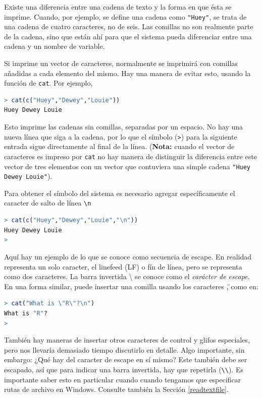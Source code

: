 Existe una diferencia entre una cadena de texto y la forma en que ésta se
imprime. Cuando, por ejemplo, se define una cadena como \texttt{"Huey"}, se
trata de una cadena de cuatro caracteres, no de seis. Las comillas no son
realmente parte de la cadena, sino que están ahí para que el sistema pueda
diferenciar entre una cadena y un nombre de variable.

Si imprime un vector de caracteres, normalmente se imprimirá con comillas
añadidas a cada elemento del mismo. Hay una manera de evitar esto, usando la
función de \texttt{cat}.  Por ejemplo,

\begin{lstlisting}[language=R]
> cat(c("Huey","Dewey","Louie"))
Huey Dewey Louie
\end{lstlisting}

Esto imprime las cadenas sin comillas, separadas por un espacio. No hay una
nueva línea que siga a la cadena, por lo que el símbolo (\texttt{>}) para la
siguiente entrada sigue directamente al final de la línea. (\textbf{Nota:}
cuando el vector de caracteres es impreso por \texttt{cat} no hay manera de
distinguir la diferencia entre este vector de tres elementos con un vector que
contuviera una simple cadena \texttt{"Huey Dewey Louie"}).

Para obtener el símbolo del sistema es necesario agregar específicamente el
caracter de salto de línea \texttt{\textbackslash{}n}

\begin{lstlisting}[language=R]
> cat(c("Huey","Dewey","Louie","\n"))
Huey Dewey Louie
>
\end{lstlisting}

Aquí hay un ejemplo de lo que se conoce como secuencia de escape. En realidad
representa un solo caracter, el linefeed (LF) o fín de línea, pero se
representa como dos caracteres. La barra invertida \textbackslash{} se conoce
como el \textit{carácter de escape}. En una forma similar, puede insertar una
comilla usando los caracteres \texttt{\"}, como en:

\begin{lstlisting}[language=R]
> cat("What is \"R\"?\n")
What is "R"?
>
\end{lstlisting}

También hay maneras de insertar otros caracteres de control y glifos
especiales, pero nos llevaría demasiado tiempo discutirlo en detalle. Algo
importante, sin embargo: ¿Qué hay del caracter de escape en sí mismo?  Este
también debe ser escapado, así que para indicar una barra invertida, hay que
repetirla (\texttt{\textbackslash{}\textbackslash{}}). Es importante saber esto
en particular cuando cuando tengamos que especificar rutas de archivo en
Windows. Consulte también la Sección \ref{readtextfile}.

